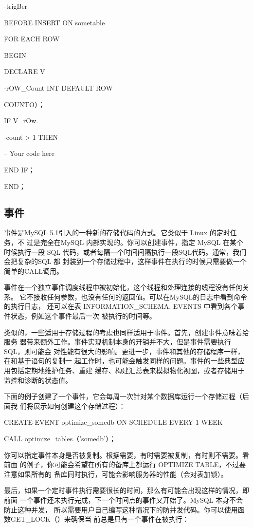 -trigBer

BEFORE INSERT ON sometable

FOR EACH ROW

BEGIN

DECLARE V

-rOW\_Count INT DEFAULT ROW

COUNTO）；

IF V\_rOw.

-count > 1 THEN

-- Your code here

END IF；

END；

\subsection{事件}
事件是MySQL 5.1引入的一种新的存储代码的方式。它类似于 Linux 的定时任务，不
过是完全在MySQL 内部实现的。你可以创建事件，指定 MySQL 在某个时候执行一段
SQL 代码，或者每隔一个时间间隔执行一段SQL代码。通常，我们会把复杂的SQL 都
封装到一个存储过程中，这样事件在执行的时候只需要做一个简单的CALL调用。

事件在一个独立事件调度线程中被初始化，这个线程和处理连接的线程没有任何关系。
它不接收任何参数，也没有任何的返回值。可以在MySQL的日志中看到命令的执行日志，
还可以在表 INFORMATION\_SCHEMA. EVENTS 中看到各个事件状态，例如这个事件最后一次
被执行的时间等。

类似的，一些适用于存储过程的考虑也同样适用于事件。首先，创建事件意味着给服务
器带来额外工作。事件实现机制本身的开销并不大，但是事件需要执行SQL，则可能会
对性能有很大的影响。更进一步，事件和其他的存储程序一样，在和基于语句的复制一
起工作时，也可能会触发同样的问题。事件的一些典型应用包括定期地维护任务、重建
缓存、构建汇总表来模拟物化视图，或者存储用于监控和诊断的状态值。

下面的例子创建了一个事件，它会每周一次针对某个数据库运行一个存储过程（后面我
们将展示如何创建这个存储过程）：

CREATE EVENT optimize\_somedb ON SCHEDULE EVERY 1 WEEK

CALL optimize\_tables（'somedb'）；

你可以指定事件本身是否被复制。根据需要，有时需要被复制，有时则不需要。看前面
的例子，你可能会希望在所有的备库上都运行 OPTIMIZE TABLE，不过要注意如果所有的
备库同时执行，可能会影响服务器的性能（会对表加锁）。

最后，如果一个定时事件执行需要很长的时间，那么有可能会出现这样的情况，即前面
一个事件还未执行完成，下一个时间点的事件又开始了。MySQL 本身不会防止这种并发，
所以需要用户自己编写这种情况下的防并发代码。你可以使用函数GET\_LOCK（）来确保当
前总是只有一个事件在被执行：


